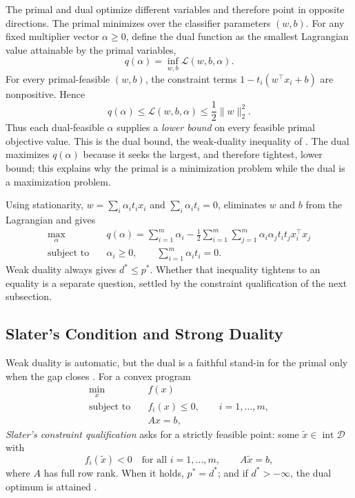 \documentclass[11pt,a4paper]{article}
\numberwithin{equation}{section} %
\begin{document}
The primal and dual optimize different variables and therefore point in
opposite directions. The primal minimizes over the classifier parameters
$(w,b)$. For any fixed multiplier vector $\alpha\geq0$, define the dual
function as the smallest Lagrangian value attainable by the primal variables,
\begin{equation}
    q(\alpha)=\inf_{w,b}\mathcal{L}(w,b,\alpha).
\end{equation}
For every primal-feasible $(w,b)$, the constraint terms
$1-t_i(w^\top x_i+b)$ are nonpositive. Hence
\begin{equation}
    q(\alpha)\leq \mathcal{L}(w,b,\alpha)
    \leq \frac12\lVert w\rVert_2^2.
\end{equation}
Thus each dual-feasible $\alpha$ supplies a \emph{lower bound} on every
feasible primal objective value. This is the dual bound, the weak-duality
inequality of \cite{lec-duality}. The dual maximizes
$q(\alpha)$ because it seeks the largest, and therefore tightest, lower bound;
this explains why the primal is a minimization problem while the dual is a
maximization problem.

Using stationarity,
$w=\sum_i\alpha_i t_i x_i$ and $\sum_i\alpha_i t_i=0$, eliminates $w$ and
$b$ from the Lagrangian and gives
\begin{equation}
\begin{aligned}
\max_{\alpha}\quad
&q(\alpha)=\sum_{i=1}^{m}\alpha_i
-\frac12\sum_{i=1}^{m}\sum_{j=1}^{m}
  \alpha_i\alpha_j t_i t_j x_i^\top x_j\\
\text{subject to}\quad
&\alpha_i\geq0,\qquad
\sum_{i=1}^{m}\alpha_i t_i=0.
\end{aligned}
\end{equation}
Weak duality always gives $d^*\leq p^*$. Whether that inequality tightens to
an equality is a separate question, settled by the constraint qualification of
the next subsection.

\subsection{Slater's Condition and Strong Duality}
\label{sec:slater}

Weak duality is automatic, but the dual is a faithful stand-in for the primal
only when the gap closes \cite{lec-duality}. For a convex program
\begin{equation}
\begin{aligned}
\min_{x}\quad & f(x)\\
\text{subject to}\quad & f_i(x)\leq0,\qquad i=1,\ldots,m,\\
& Ax=b,
\end{aligned}
\end{equation}
\emph{Slater's constraint qualification} asks for a strictly feasible point:
some $\tilde{x}\in\operatorname{int}\mathcal{D}$ with
\begin{equation}
    f_i(\tilde{x})<0 \quad\text{for all } i=1,\ldots,m,
    \qquad A\tilde{x}=b,
\end{equation}
where $A$ has full row rank. When it holds, $p^*=d^*$; and if $d^*>-\infty$,
the dual optimum is attained \cite{boyd2004}.
\end{document}
